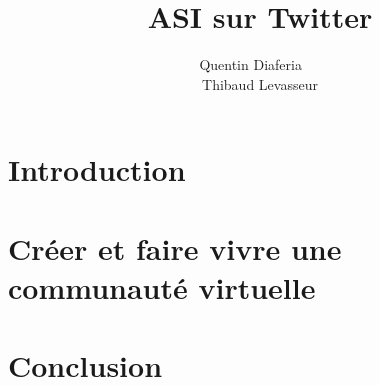\documentclass[a4paper,12pt]{article}
\title{ASI sur Twitter}
\author{Quentin Diaferia ~~\\ Thibaud Levasseur}
\begin{document}
\maketitle
\newpage
\tableofcontents
\newpage
\section{Introduction}

\section{Créer et faire vivre une communauté virtuelle}

\section{Conclusion}
\end{document}
